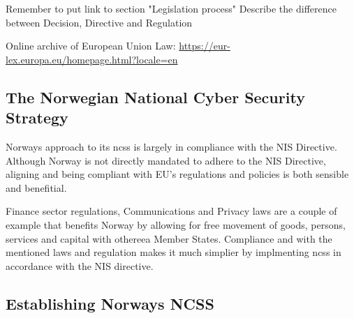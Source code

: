 \begin{followup}
    Remember to put link to section "Legislation process"
    Describe the difference between Decision, Directive and Regulation
\end{followup}

 Online archive of European Union Law: \url{https://eur-lex.europa.eu/homepage.html?locale=en}

\newpage

\subsection{The Norwegian National Cyber Security Strategy}

Norways approach to its \acrshort{ncss} is largely in compliance with the NIS Directive. Although Norway is not directly mandated to adhere to the NIS Directive, aligning and being compliant with EU's regulations and policies is both sensible and benefitial. 

Finance sector regulations, Communications and Privacy laws are a couple of example that benefits Norway by allowing for free movement of goods, persons, services and capital with other\acrshort{eea} Member States. Compliance and with the mentioned laws and regulation makes it much simplier by implmenting \acrshort{ncss} in accordance with the NIS directive.

\subsection{Establishing Norways NCSS}

